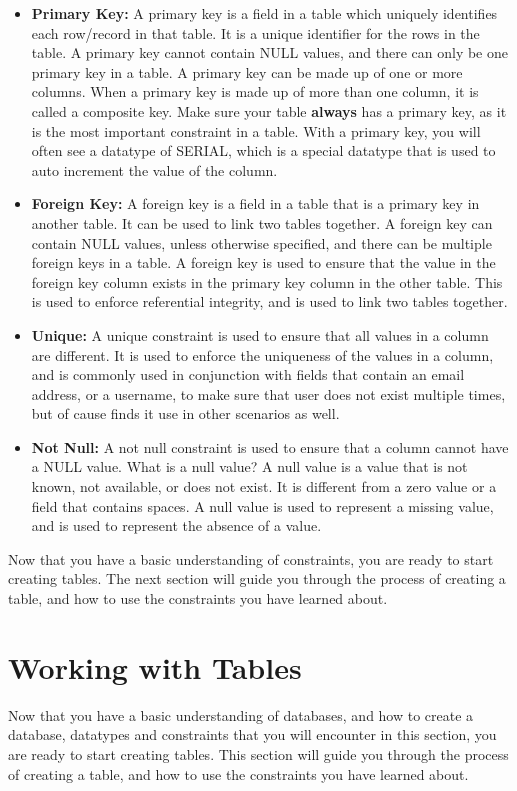 \begin{itemize}
    \item \textbf{Primary Key:} A primary key is a field in a table which uniquely identifies each row/record in that table. It is a unique identifier for the rows in the table. A primary key cannot contain NULL values, and there can only be one primary key in a table. A primary key can be made up of one or more columns. When a primary key is made up of more than one column, it is called a composite key. Make sure your table \textbf{always} has a primary key, as it is the most important constraint in a table. With a primary key, you will often see a datatype of SERIAL, which is a special datatype that is used to auto increment the value of the column.
    \item \textbf{Foreign Key:} A foreign key is a field in a table that is a primary key in another table. It can be used to link two tables together. A foreign key can contain NULL values, unless otherwise specified, and there can be multiple foreign keys in a table. A foreign key is used to ensure that the value in the foreign key column exists in the primary key column in the other table. This is used to enforce referential integrity, and is used to link two tables together.
    \item \textbf{Unique:} A unique constraint is used to ensure that all values in a column are different. It is used to enforce the uniqueness of the values in a column, and is commonly used in conjunction with fields that contain an email address, or a username, to make sure that user does not exist multiple times, but of cause finds it use in other scenarios as well.
    \item \textbf{Not Null:} A not null constraint is used to ensure that a column cannot have a NULL value. What is a null value? A null value is a value that is not known, not available, or does not exist. It is different from a zero value or a field that contains spaces. A null value is used to represent a missing value, and is used to represent the absence of a value.
\end{itemize}

Now that you have a basic understanding of constraints, you are ready to start creating tables. The next section will guide you through the process of creating a table, and how to use the constraints you have learned about.

\section{Working with Tables}
Now that you have a basic understanding of databases, and how to create a database, datatypes and constraints that you will encounter in this section, you are ready to start creating tables. This section will guide you through the process of creating a table, and how to use the constraints you have learned about.

